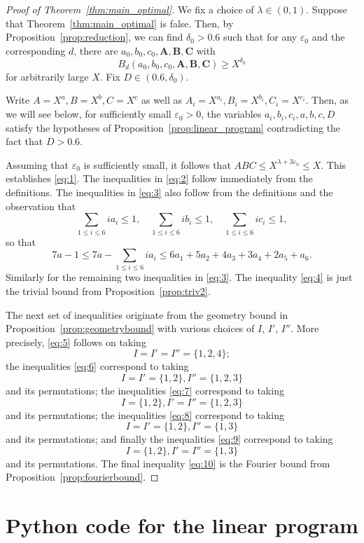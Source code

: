 \documentclass[a4paper,11pt,twoside,reqno]{amsart}
\def\Ab{\mathbf{A}}
\def\Bb{\mathbf{B}}
\def\Cb{\mathbf{C}}
\renewcommand{\leq}{\leqslant}
\renewcommand{\le}{\leqslant}
\renewcommand{\ge}{\geqslant}
\newcommand\ve{\varepsilon}
\theoremstyle{plain}
\theoremstyle{remark}
\numberwithin{prop}{section}
\numberwithin{equation}{section}
\begin{document}
\begin{proof}[Proof of Theorem~\ref{thm:main_optimal}]
We fix a choice of  $\lambda\in (0,1)$. 
Suppose that 
Theorem~\ref{thm:main_optimal} is false. Then, by Proposition~\ref{prop:reduction}, we can find $\delta_0>0.6$ such that for any $\varepsilon_0$ and the corresponding $d$, there are $a_0,b_0,c_0, \Ab,\Bb,\Cb$ with
    \[B_d(a_0,b_0,c_0,\Ab,\Bb,\Cb) \ge X^{\delta_0}\]
    for arbitrarily large $X$. Fix $D \in (0.6,\delta_0)$.

    Write $A=X^a, B=X^b, C=X^c$ as well as $A_i=X^{a_i}, B_i=X^{b_i}, C_i=X^{c_i}$. Then, as we will see below, for sufficiently small $\varepsilon_0>0$, the variables $a_i,b_i,c_i,a,b,c,D$ satisfy the hypotheses of Proposition~\ref{prop:linear_program} contradicting the fact that $D>0.6$.

Assuming that $\ve_0$ is sufficiently small, it follows that $ABC\leq X^{\lambda+3\ve_0}\leq X$. This establishes  \eqref{eq:1}. The 
inequalities in
  \eqref{eq:2} 
follow immediately from the definitions. 
The inequalities in \eqref{eq:3} also follow from the definitions and the observation that 
$$
\sum_{1\leq i\leq 6} ia_i \leq 1, \quad 
\sum_{1\leq i\leq 6} ib_i \leq 1, \quad
\sum_{1\leq i\leq 6} ic_i \leq 1,
$$
so that 
$$
7a-1\le 7a-\sum_{1\leq i\leq 6} ia_i\leq 6a_1+5a_2+4a_3+3a_4+2a_5+a_6.
$$
Similarly for the remaining two inequalities in \eqref{eq:3}.
The  inequality \eqref{eq:4} is just the trivial bound from Proposition~\ref{prop:triv2}.


    The next set of  inequalities originate from the geometry bound in Proposition~\ref{prop:geometrybound} with various choices of $I$, $I'$, $I''$. 
       More precisely, \eqref{eq:5} follows on taking
    \[
    I=I'=I''=\{1,2,4\};
    \]
the inequalities \eqref{eq:6} correspond to taking 
    \[
    I=I'=\{1,2\}, I''=\{1,2,3\}
    \]
    and its permutations;
the inequalities \eqref{eq:7} correspond to taking 
    \[
    I=\{1,2\}, I'=I''=\{1,2,3\}
    \]
    and its permutations; 
    the inequalities \eqref{eq:8} correspond to taking 
    \[
    I=I'=\{1,2\}, I''=\{1,3\}
    \]
    and its permutations; and finally
the inequalities \eqref{eq:9} correspond to taking 
    \[
    I=\{1,2\}, I'=I''=\{1,3\}
    \]
    and its permutations.
The final  inequality \eqref{eq:10} is the Fourier bound from Proposition~\ref{prop:fourierbound}.
\end{proof}



\appendix
\section{Python code for the linear program}\label{s:code}
\end{document}
